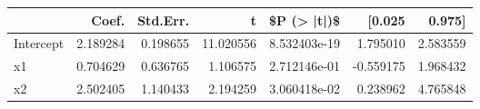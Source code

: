 \begin{tabular}{lrrrrrr}
\toprule
{} &     Coef. &  Std.Err. &          t &   \$P (> |t|)\$ &    [0.025 &    0.975] \\
\midrule
Intercept &  2.189284 &  0.198655 &  11.020556 &  8.532403e-19 &  1.795010 &  2.583559 \\
x1        &  0.704629 &  0.636765 &   1.106575 &  2.712146e-01 & -0.559175 &  1.968432 \\
x2        &  2.502405 &  1.140433 &   2.194259 &  3.060418e-02 &  0.238962 &  4.765848 \\
\bottomrule
\end{tabular}
